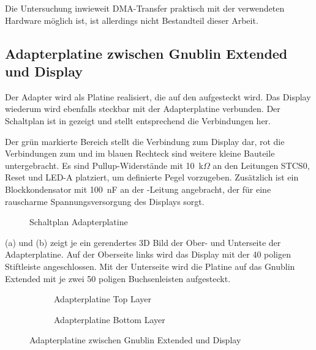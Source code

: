 Die Untersuchung inwieweit DMA-Transfer praktisch mit der verwendeten Hardware möglich ist, ist allerdings nicht Bestandteil dieser Arbeit. 

\newpage
\subsection{Adapterplatine zwischen Gnublin Extended und Display}
Der Adapter wird als Platine realisiert, die auf den  aufgesteckt wird. Das Display wiederum wird ebenfalls steckbar mit der Adapterplatine verbunden. Der Schaltplan ist in  gezeigt und stellt entsprechend  die Verbindungen her.

Der grün markierte Bereich stellt die Verbindung zum Display dar, rot die Verbindungen zum  und im blauen Rechteck sind weitere kleine Bauteile untergebracht. Es sind Pullup-Widerstände mit 10~k$\Omega$ an den Leitungen STCS0, Reset und LED-A platziert, um definierte Pegel vorzugeben. Zusätzlich ist ein Blockkondensator mit 100~nF an der -Leitung angebracht, der für eine rauscharme Spannungsversorgung des Displays sorgt.

\begin{figure}[tbph]
	\centering
{}
	\caption{Schaltplan Adapterplatine}
	\label{fig:adapterplatine_sch}
\end{figure}
\newpage

 (a) und (b) zeigt je ein gerendertes 3D Bild der Ober- und Unterseite der Adapterplatine. Auf der Oberseite links wird das Display mit der 40 poligen Stiftleiste angeschlossen. Mit der Unterseite wird die Platine auf das Gnublin Extended mit je zwei 50 poligen Buchsenleisten aufgesteckt.

\begin{figure}
        \begin{center}
        \begin{subfigure}[htp]{0.8\textwidth}
                \caption{Adapterplatine Top Layer}
                \label{fig:adapter_top}
        \end{subfigure}

        \begin{subfigure}[htp]{0.8\textwidth}
                             				\caption{Adapterplatine Bottom Layer}
                \label{fig:adapter_bot}
        \end{subfigure}
		\end{center}
        \caption{Adapterplatine zwischen Gnublin Extended und Display}\label{fig:adapterplatine}
\end{figure}

